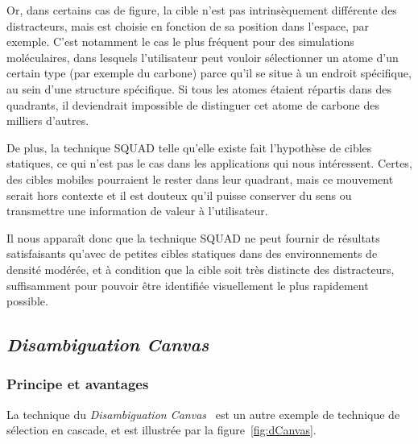 	Or, dans certains cas de figure, la cible n'est pas intrinsèquement différente des distracteurs, mais est choisie en fonction de sa position dans l'espace, par exemple. C'est notamment le cas le plus fréquent pour des simulations moléculaires, dans lesquels l'utilisateur peut vouloir sélectionner un atome d'un certain type (par exemple du carbone) parce qu'il se situe à un endroit spécifique, au sein d'une structure spécifique. Si tous les atomes étaient répartis dans des quadrants, il deviendrait impossible de distinguer cet atome de carbone des milliers d'autres.
	
	De plus, la technique SQUAD telle qu'elle existe fait l'hypothèse de cibles statiques, ce qui n'est pas le cas dans les applications qui nous intéressent. Certes, des cibles mobiles pourraient le rester dans leur quadrant, mais ce mouvement serait hors contexte et il est douteux qu'il puisse conserver du sens ou transmettre une information de valeur à l'utilisateur.
	
	Il nous apparaît donc que la technique SQUAD ne peut fournir de résultats satisfaisants qu'avec de petites cibles statiques dans des environnements de densité modérée, et à condition que la cible soit très distincte des distracteurs, suffisamment pour pouvoir être identifiée visuellement le plus rapidement possible.
	
	\subsection{\emph{Disambiguation Canvas}}
	\subsubsection{Principe et avantages}
	La technique du \emph{Disambiguation Canvas}~\cite{debarba2013disambiguation} est un autre exemple de technique de sélection en cascade, et est illustrée par la figure~\ref{fig:dCanvas}.
		 
